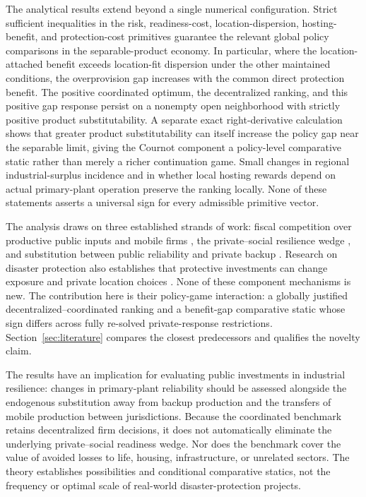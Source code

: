 The analytical results extend beyond a single numerical configuration. Strict sufficient inequalities in the risk, readiness-cost, location-dispersion, hosting-benefit, and protection-cost primitives guarantee the relevant global policy comparisons in the separable-product economy. In particular, where the location-attached benefit exceeds location-fit dispersion under the other maintained conditions, the overprovision gap increases with the common direct protection benefit. The positive coordinated optimum, the decentralized ranking, and this positive gap response persist on a nonempty open neighborhood with strictly positive product substitutability. A separate exact right-derivative calculation shows that greater product substitutability can itself increase the policy gap near the separable limit, giving the Cournot component a policy-level comparative static rather than merely a richer continuation game. Small changes in regional industrial-surplus incidence and in whether local hosting rewards depend on actual primary-plant operation preserve the ranking locally. None of these statements asserts a universal sign for every admissible primitive vector.

The analysis draws on three established strands of work: fiscal competition over productive public inputs and mobile firms \citep{KeenMarchand1997,BayindirUpmann1998,WalzWellisch1996}, the private--social resilience wedge \citep{GrossmanHelpmanLhuillier2023}, and substitution between public reliability and private backup \citep{BrehmJohnstonMilton2024}. Research on disaster protection also establishes that protective investments can change exposure and private location choices \citep{KouskyLuttmerZeckhauser2006,SeshimoYamazaki2018}. None of these component mechanisms is new. The contribution here is their policy-game interaction: a globally justified decentralized--coordinated ranking and a benefit-gap comparative static whose sign differs across fully re-solved private-response restrictions. Section~\ref{sec:literature} compares the closest predecessors and qualifies the novelty claim.

The results have an implication for evaluating public investments in industrial resilience: changes in primary-plant reliability should be assessed alongside the endogenous substitution away from backup production and the transfers of mobile production between jurisdictions. Because the coordinated benchmark retains decentralized firm decisions, it does not automatically eliminate the underlying private--social readiness wedge. Nor does the benchmark cover the value of avoided losses to life, housing, infrastructure, or unrelated sectors. The theory establishes possibilities and conditional comparative statics, not the frequency or optimal scale of real-world disaster-protection projects.

